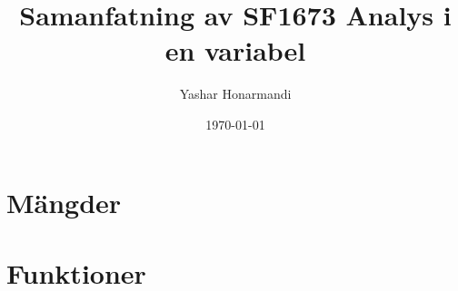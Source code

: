 \documentclass[a4paper, 11pt]{article}
\title{Samanfatning av SF1673 Analys i en variabel}
\author{Yashar Honarmandi}
\date{\today}
\begin{document}
\sloppy

\maketitle

\begin{abstract}
	
\end{abstract}

\thispagestyle{empty}

\newpage

\tableofcontents

\newpage


\twocolumn

\section{Mängder}



\section{Funktioner}


\end{document}

